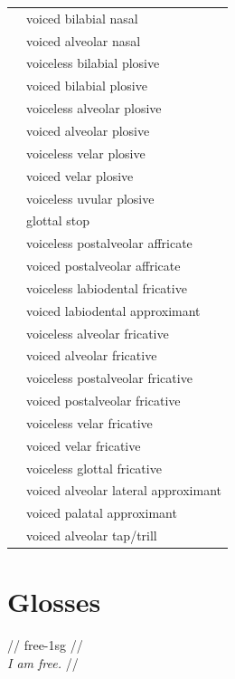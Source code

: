 \documentclass{article}
\begin{document}
\begin{xltabular}{\textwidth}{lL}
   & voiced bilabial nasal \\
   & voiced alveolar nasal \\
   & voiceless bilabial plosive \\
   & voiced bilabial plosive \\
   & voiceless alveolar plosive \\
   & voiced alveolar plosive \\
   & voiceless velar plosive \\
   & voiced velar plosive \\
   & voiceless uvular plosive \\
   & glottal stop \\
   & voiceless postalveolar affricate \\
   & voiced postalveolar affricate \\
   & voiceless labiodental fricative \\
   & voiced labiodental approximant \\
   & voiceless alveolar fricative \\
   & voiced alveolar fricative \\
   & voiceless postalveolar fricative \\
   & voiced postalveolar fricative \\
   & voiceless velar fricative \\
   & voiced velar fricative \\
   & voiceless glottal fricative \\
   & voiced alveolar lateral approximant \\
   & voiced palatal approximant \\
   & voiced alveolar tap/trill \\
\end{xltabular}

\newpage\section{Glosses}

\ex
\begingl
\gla {}  //
 free-{\sc 1sg} //
\\\textit{I am free.} //
\endgl
\xe
\end{document}
